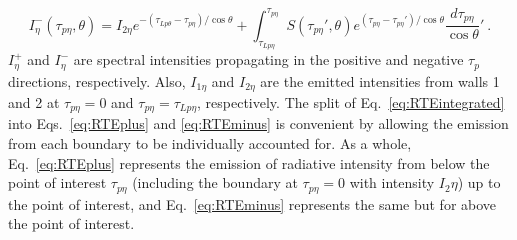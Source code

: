 \begin{equation}
    I^-_\eta{}(\tau_{p\eta},\theta) = I_{2\eta{}}e^{-(\tau_{Lp\theta}-\tau_{p\eta})/\cos{\theta}} + 
    \int_{\tau_{Lp\eta}}^{\tau_{p\eta}}{S(\tau_{p\eta}',\theta)e^{(\tau_{p\eta}-\tau_{p\eta}')/\cos{\theta}}}\frac{d\tau_{p\eta}}{\cos{\theta}}' \ .
    \label{eq:RTEminus}
\end{equation}
$I^+_\eta$ and $I^-_\eta$ are spectral intensities propagating in the positive and negative $\tau_{p}$ directions, respectively. Also, $I_{1\eta}$ and $I_{2\eta}$ are the emitted intensities from walls 1 and 2 at $\tau_{p\eta}=0$ and $\tau_{p\eta}=\tau_{Lp\eta}$, respectively. The split of Eq.~\ref{eq:RTEintegrated} into Eqs.~\ref{eq:RTEplus} and \ref{eq:RTEminus} is convenient by allowing the emission from each boundary to be individually accounted for. As a whole, Eq.~\ref{eq:RTEplus} represents the emission of radiative intensity from below the point of interest $\tau_{p\eta}$ (including the boundary at $\tau_{p\eta}=0$ with intensity $I_2{\eta}$) up to the point of interest, and Eq.~\ref{eq:RTEminus} represents the same but for above the point of interest.

